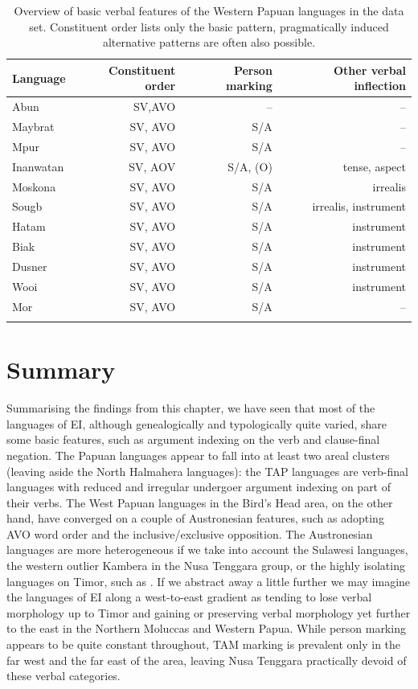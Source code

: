 \begin{table}[h]
\begin{tabular}{l r r r}
\lsptoprule
Language & Constituent order & Person marking & Other verbal inflection \tabularnewline
\midrule
Abun & SV,AVO & -- & -- \tabularnewline
Maybrat & SV, AVO & S/A & -- \tabularnewline
Mpur & SV, AVO & S/A & -- \tabularnewline
Inanwatan & SV, AOV & S/A, (O) & tense, aspect \tabularnewline
\midrule
Moskona & SV, AVO & S/A & irrealis \tabularnewline
Sougb & SV, AVO & S/A & irrealis, instrument \tabularnewline
Hatam & SV, AVO & S/A & instrument \tabularnewline
\midrule
Biak & SV, AVO & S/A & instrument \tabularnewline
Dusner & SV, AVO & S/A & instrument \tabularnewline
Wooi & SV, AVO & S/A & instrument \tabularnewline
Mor & SV, AVO & S/A & -- \tabularnewline
\lspbottomrule
\end{tabular}
\caption[Basic verbal features of the Western Papuan languages]{Overview of basic verbal features of the Western Papuan languages in the data set. Constituent order lists only the basic pattern, pragmatically induced alternative patterns are often also possible.}
\label{table:overviewpapua}
\end{table}

\section{Summary}
Summarising the findings from this chapter, we have seen that most of the languages of EI, although genealogically and typologically quite varied, share some basic features, such as argument indexing on the verb and clause-final negation. The Papuan languages appear to fall into at least two areal clusters (leaving aside the North Halmahera languages): the TAP languages are verb-final languages with reduced and irregular undergoer argument indexing on part of their verbs. The West Papuan languages in the Bird's Head area, on the other hand, have converged on a couple of Austronesian features, such as adopting AVO word order and the inclusive/exclusive opposition. The Austronesian languages are more heterogeneous if we take into account the Sulawesi languages, the western outlier Kambera in the Nusa Tenggara group, or the highly isolating languages on Timor, such as . If we abstract away a little further we may imagine the languages of EI along a west-to-east gradient as tending to lose verbal morphology up to Timor and gaining or preserving verbal morphology yet further to the east in the Northern Moluccas and Western Papua. While person marking appears to be quite constant throughout, TAM marking is prevalent only in the far west and the far east of the area, leaving Nusa Tenggara practically devoid of these verbal categories.

